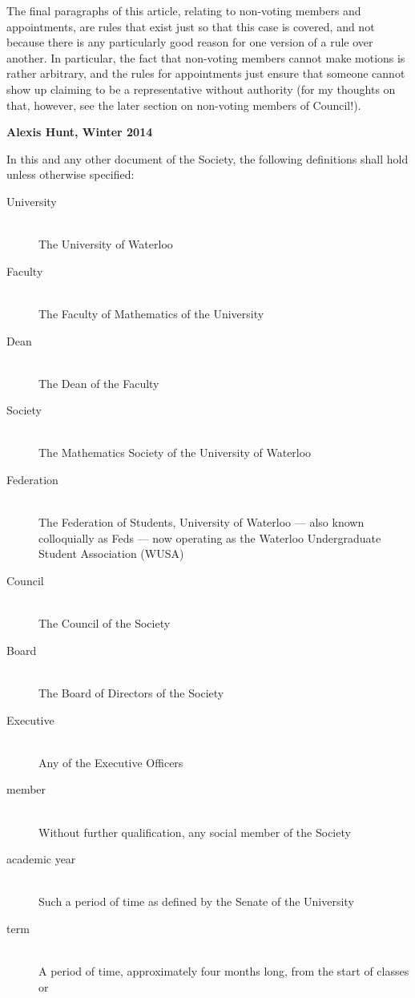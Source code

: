 \begin{annotation}
The final paragraphs of this article, relating to non-voting members and
appointments, are rules that exist just so that this case is covered, and not
because there is any particularly good reason for one version of a rule over
another. In particular, the fact that non-voting members cannot make motions is
rather arbitrary, and the rules for appointments just ensure that someone cannot
show up claiming to be a representative without authority (for my thoughts on
that, however, see the later section on non-voting members of Council!).

\textbf{Alexis Hunt, Winter 2014}
\end{annotation}

In this and any other document of the Society, the following definitions shall
hold unless otherwise specified:
\begin{description}
\item[University]\hfill\\
  The University of Waterloo
\item[Faculty]\hfill\\
  The Faculty of Mathematics of the University
\item[Dean]\hfill\\
  The Dean of the Faculty
\item[Society]\hfill\\
    The Mathematics Society of the University of Waterloo
\item[Federation]\hfill\\
    The Federation of Students, University of Waterloo --- also known colloquially as Feds --- now operating as the Waterloo Undergraduate Student Association (WUSA)
\item[Council]\hfill\\
    The Council of the Society
\item[Board]\hfill\\
    The Board of Directors of the Society
\item[Executive]\hfill\\
    Any of the Executive Officers
\item[member]\hfill\\
  Without further qualification, any social member of the Society
\item[academic year]\hfill\\
  Such a period of time as defined by the Senate of the University
\item[term]\hfill\\
  A period of time, approximately four months long, from the start of classes or

\end{description}
